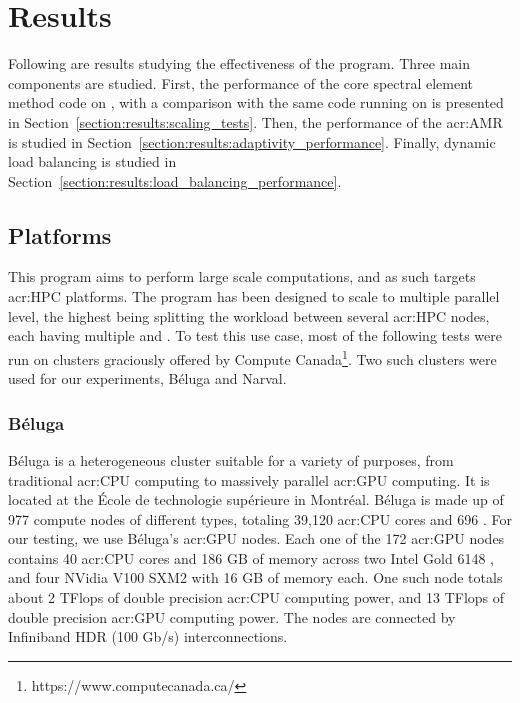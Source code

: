 \chapter{Results} \label{chapter:results}

Following are results studying the effectiveness of the program. Three main components are studied.
First, the performance of the core spectral element method code on , with a
comparison with the same code running on  is presented in
Section~\ref{section:results:scaling_tests}. Then, the performance of the \acrlong{acr:AMR} is
studied in Section~\ref{section:results:adaptivity_performance}. Finally, dynamic load balancing is
studied in Section~\ref{section:results:load_balancing_performance}.

\section{Platforms} \label{section:results:platforms}

This program aims to perform large scale computations, and as such targets \acrshort{acr:HPC}
platforms. The program has been designed to scale to multiple parallel level, the highest being
splitting the workload between several \acrshort{acr:HPC} nodes, each having multiple
 and . To test this use case, most of the following tests
were run on clusters graciously offered by Compute Canada\footnote{https://www.computecanada.ca/}.
Two such clusters were used for our experiments, Béluga and Narval.

\subsection{Béluga} \label{subsection:results:platforms:beluga}

Béluga is a heterogeneous cluster suitable for a variety of purposes, from traditional
\acrshort{acr:CPU} computing to massively parallel \acrshort{acr:GPU} computing. It is located at
the École de technologie supérieure in Montréal. Béluga is made up of 977 compute nodes of different
types, totaling 39,120 \acrshort{acr:CPU} cores and 696 . For our testing, we
use Béluga's \acrshort{acr:GPU} nodes. Each one of the 172 \acrshort{acr:GPU} nodes contains 40
\acrshort{acr:CPU} cores and 186 GB of memory across two Intel Gold 6148 , and
four NVidia V100 SXM2  with 16 GB of memory each. One such node totals about 2
TFlops of double precision \acrshort{acr:CPU} computing power, and 13 TFlops of double precision
\acrshort{acr:GPU} computing power. The nodes are connected by Infiniband HDR (100 Gb/s)
interconnections.

